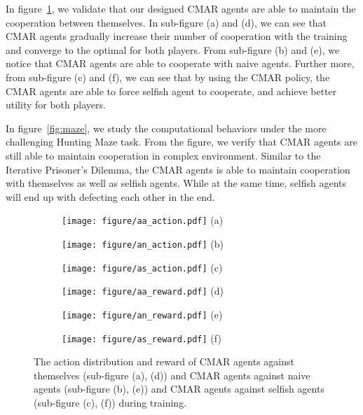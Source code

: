 \documentclass{article}
\begin{document}
In figure~\ref{fig:cmar},
we validate that our designed CMAR agents are able to maintain the cooperation between themselves.
In sub-figure (a) and (d),
we can see that CMAR agents gradually increase their number of cooperation with the training
and converge to the optimal for both players.
From sub-figure (b) and (e), we notice that CMAR agents are able to cooperate with naive agents.
Further more, from sub-figure (c) and (f), we can see that by using the CMAR policy,
the CMAR agents are able to force selfish agent to cooperate,
and achieve better utility for both players.

In figure~\ref{fig:maze},
we study the computational behaviors under the more challenging Hunting Maze task.
From the figure,
we verify that CMAR agents are still able to maintain cooperation in complex environment.
Similar to the Iterative Prisoner's Dilemma,
the CMAR agents is able to maintain cooperation with themselves as well as selfish agents.
While at the same time, selfish agents will end up with defecting each other in the end.
\begin{figure}
\begin{subfigure}{.33\textwidth}
\centering
\texttt{[image: figure/aa\_action.pdf]}
(a)
\end{subfigure}
\begin{subfigure}{.33\textwidth}
\centering
\texttt{[image: figure/an\_action.pdf]}
(b)
\end{subfigure}
\begin{subfigure}{.33\textwidth}
\centering
\texttt{[image: figure/as\_action.pdf]}
(c)
\end{subfigure}

\begin{subfigure}{.33\textwidth}
\centering
\texttt{[image: figure/aa\_reward.pdf]}
(d)
\end{subfigure}
\begin{subfigure}{.33\textwidth}
\centering
\texttt{[image: figure/an\_reward.pdf]}
(e)
\end{subfigure}
\begin{subfigure}{.33\textwidth}
\centering
\texttt{[image: figure/as\_reward.pdf]}
(f)
\end{subfigure}
    \caption{The action distribution and reward of CMAR agents against themselves (sub-figure (a), (d)) and CMAR agents against naive agents (sub-figure (b), (e)) and CMAR agents against selfish agents (sub-figure (c), (f)) during training.}
\label{fig:cmar}
\end{figure}
\end{document}
